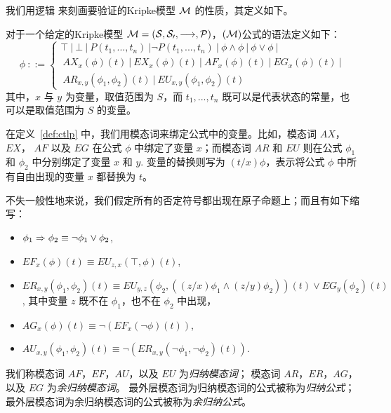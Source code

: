 我们用逻辑  来刻画要验证的Kripke模型 $\cal M$ 的性质，其定义如下。

\begin{definition}[\CTLP{}]
	\label{def:ctlp}
    对于一个给定的Kripke模型 $\cal M = (S, S_0,\longrightarrow, \mathcal{P})$，\CTLP{}$(\cal M)$公式的语法定义如下：
        $$\phi \ ::=
        \left\{\begin{array}{l}
        \top\ | \ \bot \ | \ P(t_1, ..., t_n)\  | \neg P(t_1, ..., t_n)\  | \ \phi  \wedge \phi \ |\ \phi \vee \phi \ | \\
        \ AX_x(\phi)(t)\ | \ EX_x(\phi)(t) \ | \ AF_x(\phi)(t) \ | \ EG_x(\phi)(t) \ |\\
        \ AR_{x,y}(\phi_1,\phi_2)(t)\ | \ EU_{x,y}(\phi_1,\phi_2)(t)
        \end{array}
        \right.$$
    其中，$x$ 与 $y$ 为变量，取值范围为 $S$，而 $t_1,...,t_n$ 既可以是代表状态的常量，也可以是取值范围为 $S$ 的变量。
\end{definition}
在定义~\ref{def:ctlp} 中，我们用模态词来绑定公式中的变量。比如，模态词 $AX$，$EX$， $AF$ 以及 $EG$ 在公式 $\phi$ 中绑定了变量 $x$；而模态词 $AR$ 和 $EU$ 则在公式 $\phi_1$ 和 $\phi_2$ 中分别绑定了变量 $x$ 和 $y$. 变量的替换则写为 $(t/x)\phi$，表示将公式 $\phi$ 中所有自由出现的变量 $x$ 都替换为 $t$。

不失一般性地来说，我们假定所有的否定符号都出现在原子命题上；而且有如下缩写：
\begin{itemize}
	\item $\phi_1\Rightarrow \phi_2 \equiv \neg \phi_1 \vee \phi_2$,
	\item $EF_x(\phi)(t) \equiv EU_{z,x}(\top, \phi)(t)$,
	\item $ER_{x, y}(\phi_1,\phi_2)(t) \equiv EU_{y,z}(\phi_2,((z/x)\phi_1 \wedge
	(z/y)\phi_2))(t)\vee EG_y(\phi_2)(t)$, 其中变量 $z$ 既不在 $\phi_1$，也不在 $\phi_2$ 中出现，
	\item $AG_x(\phi)(t) \equiv \neg (EF_x(\neg \phi)(t))$,
	\item $AU_{x,y}(\phi_1,\phi_2)(t) \equiv \neg (ER_{x,y}(\neg\phi_1,\neg\phi_2)(t))$.
\end{itemize}
我们称模态词 $AF$，$EF$，$AU$，以及 $EU$ 为\textit{归纳模态词}；
模态词 $AR$，$ER$，$AG$，以及 $EG$ 为\textit{余归纳模态词}。
最外层模态词为归纳模态词的公式被称为\textit{归纳公式}；
最外层模态词为余归纳模态词的公式被称为\textit{余归纳公式}。

